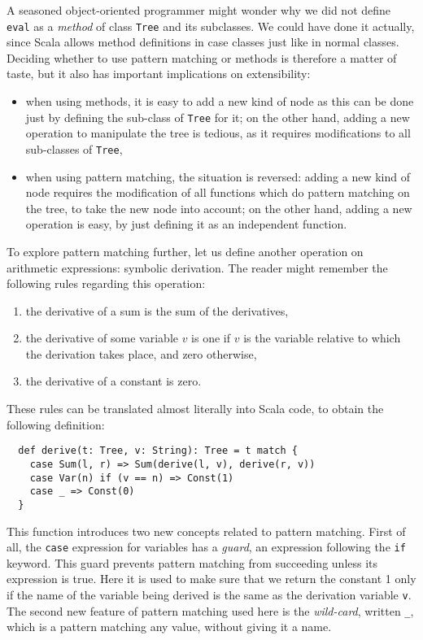 \documentclass[a4paper,12pt,twoside,titlepage]{article}
\begin{document}
A seasoned object-oriented programmer might wonder why we did not
define \lstinline?eval? as a \emph{method} of class \lstinline?Tree? and its
subclasses. We could have done it actually, since Scala allows method
definitions in case classes just like in normal classes. Deciding
whether to use pattern matching or methods is therefore a matter of
taste, but it also has important implications on extensibility:
\begin{itemize}
\item when using methods, it is easy to add a new kind of node as this
  can be done just by defining the sub-class of \lstinline?Tree? for it; on
  the other hand, adding a new operation to manipulate the tree is
  tedious, as it requires modifications to all sub-classes of
  \lstinline?Tree?,
\item when using pattern matching, the situation is reversed: adding a
  new kind of node requires the modification of all functions which do
  pattern matching on the tree, to take the new node into account; on
  the other hand, adding a new operation is easy, by just defining it
  as an independent function.
\end{itemize}

To explore pattern matching further, let us define another operation
on arithmetic expressions: symbolic derivation. The reader might
remember the following rules regarding this operation:
\begin{enumerate}
\item the derivative of a sum is the sum of the derivatives,
\item the derivative of some variable $v$ is one if $v$ is the
  variable relative to which the derivation takes place, and zero
  otherwise,
\item the derivative of a constant is zero.
\end{enumerate}
These rules can be translated almost literally into Scala code, to
obtain the following definition:
\begin{lstlisting}
  def derive(t: Tree, v: String): Tree = t match {
    case Sum(l, r) => Sum(derive(l, v), derive(r, v))
    case Var(n) if (v == n) => Const(1)
    case _ => Const(0)
  }
\end{lstlisting}%
This function introduces two new concepts related to pattern matching.
First of all, the \lstinline?case? expression for variables has a
\emph{guard}, an expression following the \lstinline?if? keyword. This
guard prevents pattern matching from succeeding unless its expression
is true. Here it is used to make sure that we return the constant 1
only if the name of the variable being derived is the same as the
derivation variable \lstinline?v?. The second new feature of pattern
matching used here is the \emph{wild-card}, written \lstinline?_?, which is
a pattern matching any value, without giving it a name.
\end{document}
